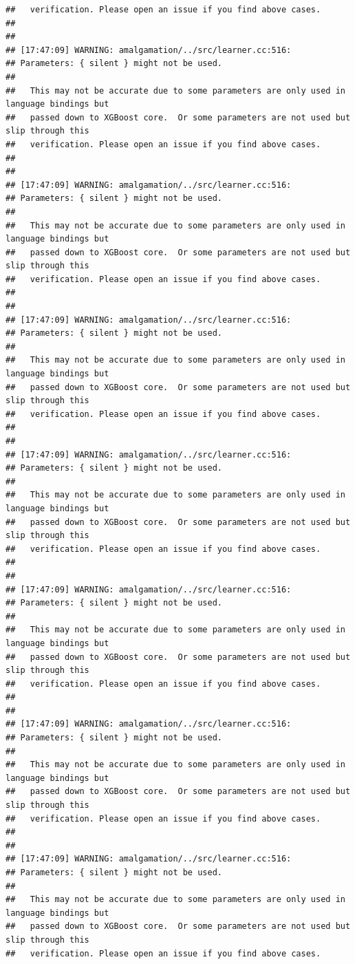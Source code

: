 \documentclass[AMS,STIX2COL]{WileyNJD-v2}\usepackage[]{graphicx}\usepackage[]{color}
\makeatletter
\newenvironment{kframe}{%
 \def\at@end@of@kframe{}%
 \ifinner\ifhmode%
  \def\at@end@of@kframe{\end{minipage}}%
  \begin{minipage}{\columnwidth}%
 \fi\fi%
 \def\FrameCommand##1{\hskip\@totalleftmargin \hskip-\fboxsep
 \colorbox{shadecolor}{##1}\hskip-\fboxsep
     \hskip-\linewidth \hskip-\@totalleftmargin \hskip\columnwidth}%
 \MakeFramed {\advance\hsize-\width
   \@totalleftmargin\z@ \linewidth\hsize
   \@setminipage}}%
 {\par\unskip\endMakeFramed%
 \at@end@of@kframe}
\newenvironment{knitrout}{}{} %
\makeatother
\begin{document}
\begin{knitrout}
\begin{kframe}
\begin{verbatim}
##   verification. Please open an issue if you find above cases.
## 
## 
## [17:47:09] WARNING: amalgamation/../src/learner.cc:516: 
## Parameters: { silent } might not be used.
## 
##   This may not be accurate due to some parameters are only used in language bindings but
##   passed down to XGBoost core.  Or some parameters are not used but slip through this
##   verification. Please open an issue if you find above cases.
## 
## 
## [17:47:09] WARNING: amalgamation/../src/learner.cc:516: 
## Parameters: { silent } might not be used.
## 
##   This may not be accurate due to some parameters are only used in language bindings but
##   passed down to XGBoost core.  Or some parameters are not used but slip through this
##   verification. Please open an issue if you find above cases.
## 
## 
## [17:47:09] WARNING: amalgamation/../src/learner.cc:516: 
## Parameters: { silent } might not be used.
## 
##   This may not be accurate due to some parameters are only used in language bindings but
##   passed down to XGBoost core.  Or some parameters are not used but slip through this
##   verification. Please open an issue if you find above cases.
## 
## 
## [17:47:09] WARNING: amalgamation/../src/learner.cc:516: 
## Parameters: { silent } might not be used.
## 
##   This may not be accurate due to some parameters are only used in language bindings but
##   passed down to XGBoost core.  Or some parameters are not used but slip through this
##   verification. Please open an issue if you find above cases.
## 
## 
## [17:47:09] WARNING: amalgamation/../src/learner.cc:516: 
## Parameters: { silent } might not be used.
## 
##   This may not be accurate due to some parameters are only used in language bindings but
##   passed down to XGBoost core.  Or some parameters are not used but slip through this
##   verification. Please open an issue if you find above cases.
## 
## 
## [17:47:09] WARNING: amalgamation/../src/learner.cc:516: 
## Parameters: { silent } might not be used.
## 
##   This may not be accurate due to some parameters are only used in language bindings but
##   passed down to XGBoost core.  Or some parameters are not used but slip through this
##   verification. Please open an issue if you find above cases.
## 
## 
## [17:47:09] WARNING: amalgamation/../src/learner.cc:516: 
## Parameters: { silent } might not be used.
## 
##   This may not be accurate due to some parameters are only used in language bindings but
##   passed down to XGBoost core.  Or some parameters are not used but slip through this
##   verification. Please open an issue if you find above cases.

\end{verbatim}
\end{kframe}
\end{knitrout}
\end{document}
